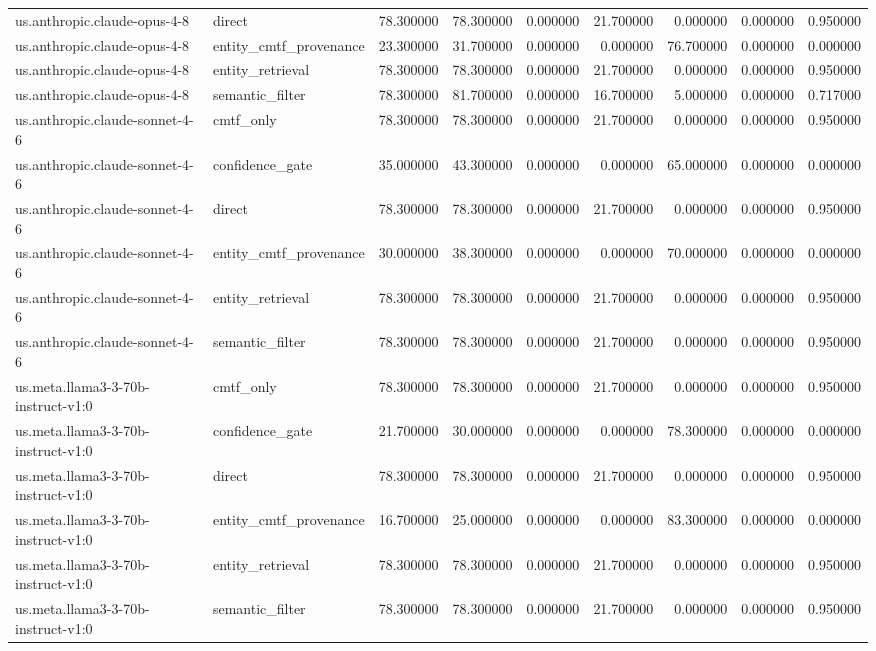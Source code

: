 \begin{tabular}{llrrrrrrr}
us.anthropic.claude-opus-4-8 & direct & 78.300000 & 78.300000 & 0.000000 & 21.700000 & 0.000000 & 0.000000 & 0.950000 \\
us.anthropic.claude-opus-4-8 & entity_cmtf_provenance & 23.300000 & 31.700000 & 0.000000 & 0.000000 & 76.700000 & 0.000000 & 0.000000 \\
us.anthropic.claude-opus-4-8 & entity_retrieval & 78.300000 & 78.300000 & 0.000000 & 21.700000 & 0.000000 & 0.000000 & 0.950000 \\
us.anthropic.claude-opus-4-8 & semantic_filter & 78.300000 & 81.700000 & 0.000000 & 16.700000 & 5.000000 & 0.000000 & 0.717000 \\
us.anthropic.claude-sonnet-4-6 & cmtf_only & 78.300000 & 78.300000 & 0.000000 & 21.700000 & 0.000000 & 0.000000 & 0.950000 \\
us.anthropic.claude-sonnet-4-6 & confidence_gate & 35.000000 & 43.300000 & 0.000000 & 0.000000 & 65.000000 & 0.000000 & 0.000000 \\
us.anthropic.claude-sonnet-4-6 & direct & 78.300000 & 78.300000 & 0.000000 & 21.700000 & 0.000000 & 0.000000 & 0.950000 \\
us.anthropic.claude-sonnet-4-6 & entity_cmtf_provenance & 30.000000 & 38.300000 & 0.000000 & 0.000000 & 70.000000 & 0.000000 & 0.000000 \\
us.anthropic.claude-sonnet-4-6 & entity_retrieval & 78.300000 & 78.300000 & 0.000000 & 21.700000 & 0.000000 & 0.000000 & 0.950000 \\
us.anthropic.claude-sonnet-4-6 & semantic_filter & 78.300000 & 78.300000 & 0.000000 & 21.700000 & 0.000000 & 0.000000 & 0.950000 \\
us.meta.llama3-3-70b-instruct-v1:0 & cmtf_only & 78.300000 & 78.300000 & 0.000000 & 21.700000 & 0.000000 & 0.000000 & 0.950000 \\
us.meta.llama3-3-70b-instruct-v1:0 & confidence_gate & 21.700000 & 30.000000 & 0.000000 & 0.000000 & 78.300000 & 0.000000 & 0.000000 \\
us.meta.llama3-3-70b-instruct-v1:0 & direct & 78.300000 & 78.300000 & 0.000000 & 21.700000 & 0.000000 & 0.000000 & 0.950000 \\
us.meta.llama3-3-70b-instruct-v1:0 & entity_cmtf_provenance & 16.700000 & 25.000000 & 0.000000 & 0.000000 & 83.300000 & 0.000000 & 0.000000 \\
us.meta.llama3-3-70b-instruct-v1:0 & entity_retrieval & 78.300000 & 78.300000 & 0.000000 & 21.700000 & 0.000000 & 0.000000 & 0.950000 \\
us.meta.llama3-3-70b-instruct-v1:0 & semantic_filter & 78.300000 & 78.300000 & 0.000000 & 21.700000 & 0.000000 & 0.000000 & 0.950000 \\
\bottomrule
\end{tabular}
